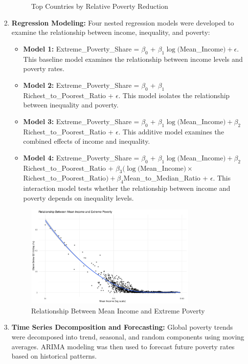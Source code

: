 \documentclass[12pt,a4paper]{article}
\begin{document}
\begin{enumerate}
\begin{figure}[h]
    \caption{Top Countries by Relative Poverty Reduction}
    \end{figure}
    \item \textbf{Regression Modeling:} Four nested regression models were developed to examine the relationship between income, inequality, and poverty: 
    \begin{itemize}
        \item \textbf{Model 1:} Extreme\_Poverty\_Share = $\beta_0$ + $\beta_1\log($Mean\_Income$) + \epsilon$. This baseline model examines the relationship between income levels and poverty rates.
        \item \textbf{Model 2:} Extreme\_Poverty\_Share = $\beta_0$ + $\beta_1$Richest\_to\_Poorest\_Ratio + $\epsilon$. This model isolates the relationship between inequality and poverty.
        \item \textbf{Model 3:} Extreme\_Poverty\_Share = $\beta_0$ + $\beta_1\log($Mean\_Income$) + \beta_2$Richest\_to\_Poorest\_Ratio + $\epsilon$. This additive model examines the combined effects of income and inequality.
        \item \textbf{Model 4:} Extreme\_Poverty\_Share = $\beta_0$ + $\beta_1\log($Mean\_Income$) + \beta_2$Richest\_to\_Poorest\_Ratio + $\beta_3(\log($Mean\_Income$) \times$ Richest\_to\_Poorest\_Ratio$) + \beta_4$Mean\_to\_Median\_Ratio + $\epsilon$. This interaction model tests whether the relationship between income and poverty depends on inequality levels.
    \end{itemize}
    \begin{figure}[h]
    \centering
    \includegraphics[width=0.8\textwidth]{../output/visualizations/income_poverty_relationship.png}
    \caption{Relationship Between Mean Income and Extreme Poverty}
    \end{figure}
    \item \textbf{Time Series Decomposition and Forecasting:} Global poverty trends were decomposed into trend, seasonal, and random components using moving averages. ARIMA modeling was then used to forecast future poverty rates based on historical patterns.

\end{enumerate}
\end{document}
